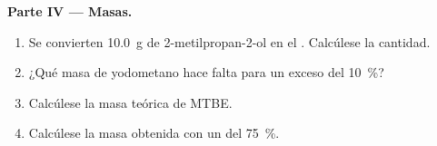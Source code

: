 \begin{problem}
\medskip
\noindent\textbf{Parte IV --- Masas.}
\begin{enumerate}[resume]
  \item Se convierten \qty{10.0}{g} de 2-metilpropan-2-ol en el .
        Calcúlese la cantidad.
  \item ¿Qué masa de yodometano hace falta para un exceso del
        \qty{10}{\percent}?
  \item Calcúlese la masa teórica de MTBE.
  \item Calcúlese la masa obtenida con un  del
        \qty{75}{\percent}.
\end{enumerate}
\end{problem}
